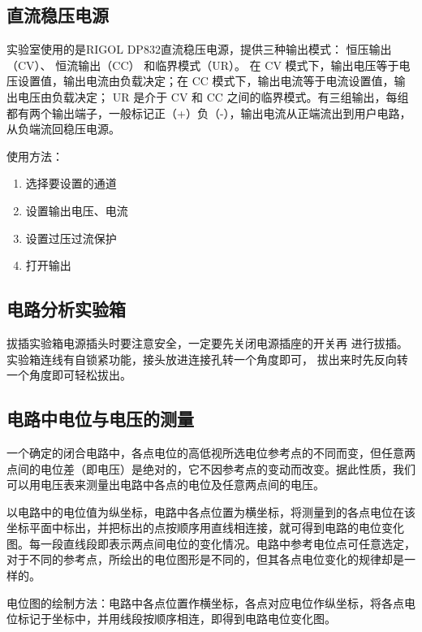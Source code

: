 \documentclass[a4paper,utf8]{article}
\begin{document}
    \subsection{直流稳压电源}
        实验室使用的是RIGOL DP832直流稳压电源，提供三种输出模式： 恒压输出（CV）、 恒流输出（CC） 和临界模式（UR）。 在 CV 模式下，输出电压等于电压设置值，输出电流由负载决定；在 CC 模式下，输出电流等于电流设置值，输出电压由负载决定； UR 是介于 CV 和 CC 之间的临界模式。有三组输出，每组都有两个输出端子，一般标记正（+）负（-），输出电流从正端流出到用户电路，从负端流回稳压电源。\par
        使用方法：
        \begin{enumerate}
            \item 选择要设置的通道
            \item 设置输出电压、电流
            \item 设置过压过流保护
            \item 打开输出
        \end{enumerate}
    
    \subsection{电路分析实验箱}
        拔插实验箱电源插头时要注意安全，一定要先关闭电源插座的开关再	进行拔插。实验箱连线有自锁紧功能，接头放进连接孔转一个角度即可，	拔出来时先反向转一个角度即可轻松拔出。
        
    \subsection{电路中电位与电压的测量}
        一个确定的闭合电路中，各点电位的高低视所选电位参考点的不同而变，但任意两点间的电位差（即电压）是绝对的，它不因参考点的变动而改变。据此性质，我们可以用电压表来测量出电路中各点的电位及任意两点间的电压。\par
        以电路中的电位值为纵坐标，电路中各点位置为横坐标，将测量到的各点电位在该坐标平面中标出，并把标出的点按顺序用直线相连接，就可得到电路的电位变化图。每一段直线段即表示两点间电位的变化情况。电路中参考电位点可任意选定，对于不同的参考点，所绘出的电位图形是不同的，但其各点电位变化的规律却是一样的。\par
        电位图的绘制方法：电路中各点位置作横坐标，各点对应电位作纵坐标，将各点电位标记于坐标中，并用线段按顺序相连，即得到电路电位变化图。
    
\end{document}
